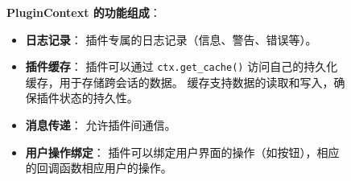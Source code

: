 \begin{figure}[H]
{\begin{minipage}[H]{0.4\textwidth}
\begin{tikzpicture}
            \end{tikzpicture}
        \end{minipage}
        \hspace{2.5cm}
        \begin{minipage}[H]{0.6\textwidth}
            \textbf{PluginContext 的功能组成}：
            \begin{itemize}
                \item \textbf{日志记录}：
                插件专属的日志记录（信息、警告、错误等）。
                \item \textbf{插件缓存}：
                插件可以通过 \texttt{ctx.get\_cache()} 访问自己的持久化缓存，用于存储跨会话的数据。
                缓存支持数据的读取和写入，确保插件状态的持久性。
                \item \textbf{消息传递}：
                允许插件间通信。
                \item \textbf{用户操作绑定}：
                插件可以绑定用户界面的操作（如按钮），相应的回调函数相应用户的操作。
            \end{itemize}
        \end{minipage}
    }
\end{figure}
